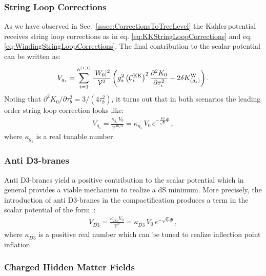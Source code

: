 \documentclass[12pt,a4paper]{book}
\newcommand{\Kahler}{\ensuremath{\text{K}\ddot{\text{a}}\text{hler}\,}}
\newcommand\vo{{\mathcal{V}}}
\begin{document}
\subsubsection{String Loop Corrections}

As we have observed in Sec.~\ref{sssec:CorrectionsToTreeLevel} the \Kahler potential receives string loop corrections as in eq. \eqref{eq:KKStringLoopCorrections} and eq. \eqref{eq:WindingStringLoopCorrections}. The final contribution to the scalar potential can be written as:
\begin{align}
V_{g_s} = \sum_{i = 1}^{h^{(1,1)}} \frac{|W_0|^2}{\vo^2} \left(g_s^2 \left(\mathcal{C}^{\rm KK}_i\right)^2 \frac{\partial^2 K_0}{\partial \tau_i^2} - 2 \delta K^{\rm W}_{(g_s)}\right).
\label{slccontributiontov}
\end{align}
Noting that $\partial^2 K_0/\partial\tau_b^2 = 3/(4 \tau_b^2)$, it turns out that in both scenarios the leading order string loop correction looks like:
\begin{align}
V_{g_s} = \frac{\kappa_{g_s}\,V_0}{\vo^{10/3}} = \kappa_{g_s}\,V_0\,e^{-\frac{10}{\sqrt{6}} \Phi}\,,
\label{Vgs}
\end{align}
where $\kappa_{g_s}$ is a real tunable number.

\subsubsection{Anti D3-branes}

Anti D3-branes yield a positive contribution to the scalar potential which in general provides a viable mechanism to realize a dS minimum. More precisely, the introduction of anti D3-branes in the compactification produces a term in the scalar potential of the form~\cite{Kachru:2003aw}:
\begin{align}
V_{\overline{D3}} = \frac{\kappa_{\overline{D3}}\,V_0}{\vo^2} = \kappa_{\overline{D3}}\,V_0\,e^{-\sqrt{6}\Phi}\,,
\label{VD3}
\end{align}
where $\kappa_{\overline{D3}}$ is a positive real number which can be tuned to realize inflection point inflation.

\subsubsection{Charged Hidden Matter Fields}
\end{document}
